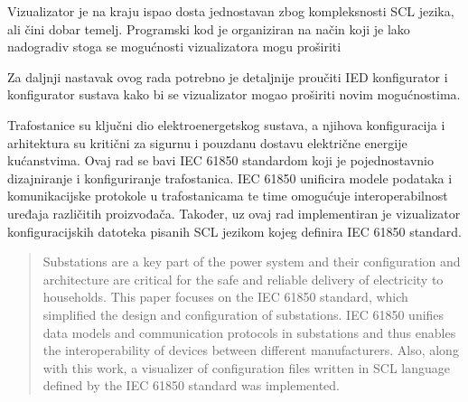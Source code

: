 \documentclass[times, utf8, zavrsni]{fer}
\begin{document}
Vizualizator je na kraju ispao dosta jednostavan zbog kompleksnosti SCL jezika, ali čini dobar temelj. Programski kod je organiziran na način koji je lako nadogradiv stoga se mogućnosti vizualizatora mogu proširiti

\bigskip
Za daljnji nastavak ovog rada potrebno je detaljnije proučiti IED konfigurator i konfigurator sustava kako bi se vizualizator mogao proširiti novim mogućnostima.




\begin{sazetak}
Trafostanice su ključni dio elektroenergetskog sustava, a njihova konfiguracija i arhitektura su kritični za sigurnu i pouzdanu dostavu električne energije kućanstvima. Ovaj rad se bavi IEC 61850 standardom koji je pojednostavnio dizajniranje i konfiguriranje trafostanica. IEC 61850 unificira  modele podataka i komunikacijske protokole u trafostanicama te time omogućuje interoperabilnost uređaja različitih proizvođača. Također, uz ovaj rad implementiran je vizualizator konfiguracijskih datoteka pisanih SCL jezikom kojeg definira IEC 61850 standard.

\end{sazetak}

\begin{abstract}
Substations are a key part of the power system and their configuration and architecture are critical for the safe and reliable delivery of electricity to households. This paper focuses on the IEC 61850 standard, which simplified the design and configuration of substations. IEC 61850 unifies data models and communication protocols in substations and thus enables the interoperability of devices between different manufacturers. Also, along with this work, a visualizer of configuration files written in SCL language defined by the IEC 61850 standard was implemented.

\end{abstract}
\end{document}

